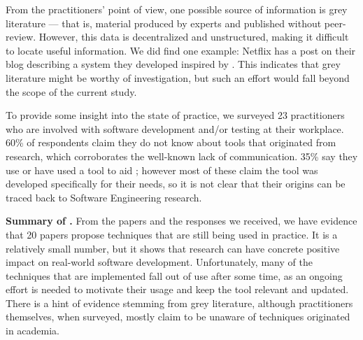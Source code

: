 From the practitioners' point of view, one possible source of information is grey literature --- that is, material produced by experts and published without peer-review.
However, this data is decentralized and unstructured, making it difficult to locate useful information.
We did find one example: Netflix has a post on their blog \cite{netflixlerner} describing a system they developed inspired by .
This indicates that grey literature might be worthy of investigation, but such an effort would fall beyond the scope of the current study.

To provide some insight into the state of practice, we surveyed 23 practitioners who are involved with software development and/or testing at their workplace.
60\% of respondents claim they do not know about \rt tools that originated from research, which corroborates the well-known lack of communication.
35\% say they use or have used a tool to aid \rt; however most of these claim the tool was developed specifically for their needs, so it is not clear that their origins can be traced back to Software Engineering research.


\begin{tcolorbox}%
\textbf{Summary of .} From the papers and the responses we received, we have evidence that 20 papers propose techniques that are still being used in practice.
It is a relatively small number, but it shows that \rt research can have concrete positive impact on real-world software development.
Unfortunately, many of the techniques that are implemented fall out of use after some time, as an ongoing effort is needed to motivate their usage and keep the tool relevant and updated.
There is a hint of evidence stemming from grey literature, although practitioners themselves, when surveyed, mostly claim to be unaware of \rt techniques originated in academia.
\end{tcolorbox}
